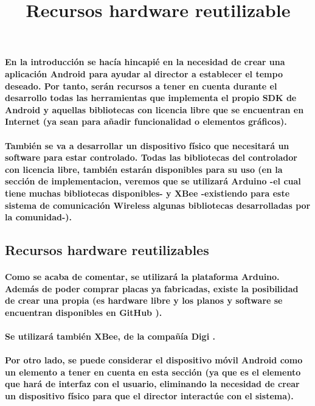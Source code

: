 \paragraph{
En la introducción se hacía hincapié en la necesidad de crear una aplicación
Android para ayudar al director a establecer el tempo deseado. Por tanto,
serán recursos a tener en cuenta durante el desarrollo todas las herramientas
que implementa el propio SDK de Android y aquellas bibliotecas con licencia
libre que se encuentran en Internet (ya sean para añadir funcionalidad o elementos
gráficos).
}

\paragraph{
También se va a desarrollar un dispositivo físico que necesitará un software para estar
controlado. Todas las bibliotecas del controlador con licencia libre, también estarán
disponibles para su uso (en la sección de implementacion, veremos que se utilizará
Arduino -el cual tiene muchas bibliotecas disponibles- y XBee -existiendo para este
sistema de comunicación Wireless algunas bibliotecas desarrolladas por la comunidad-).
}


\subsection{Recursos hardware reutilizables}
\title{Recursos hardware reutilizable}

\paragraph{
Como se acaba de comentar, se utilizará la plataforma Arduino. Además de poder comprar
placas ya fabricadas, existe la posibilidad de crear una propia (es hardware libre y
los planos y software se encuentran disponibles en GitHub \cite{arduinoRepo}).
}

\paragraph{
Se utilizará también XBee, de la compañía Digi \cite{xbeedatasheet}.
}


\paragraph{
Por otro lado, se puede considerar el dispositivo móvil Android como un elemento a
tener en cuenta en esta sección (ya que es el elemento que hará de interfaz con el usuario,
eliminando la necesidad de crear un dispositivo físico para que el director interactúe con
el sistema).
}
